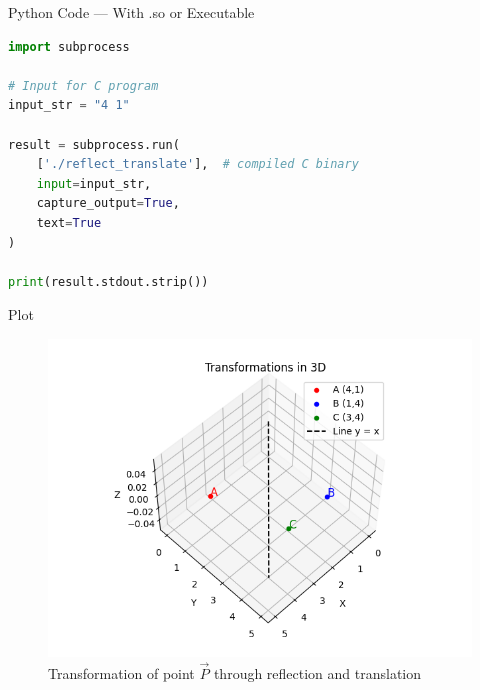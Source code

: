 \documentclass{beamer}
\begin{document}
\begin{frame}[fragile]{Python Code — With .so or Executable}
\begin{lstlisting}[language=Python]
import subprocess

# Input for C program
input_str = "4 1"

result = subprocess.run(
    ['./reflect_translate'],  # compiled C binary
    input=input_str,
    capture_output=True,
    text=True
)

print(result.stdout.strip())
\end{lstlisting}
\end{frame}




























\begin{frame}{Plot}
\begin{figure}[H]
\centering
\includegraphics[width=1\linewidth]{Figs/Fig1.png}
\caption{Transformation of point \( \vec{P} \) through reflection and translation}
\end{figure}
\end{frame}
\end{document}
